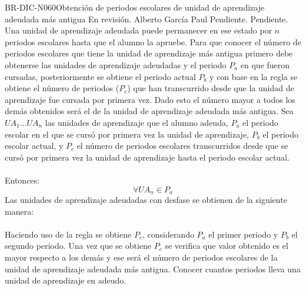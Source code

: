 \begin{BusinessRule}{BR-DIC-N060}{Obtención de periodos escolares de unidad de aprendizaje adeudada más antigua}
	{\bcCondition} %
	{\btTimer}     %
	{\blInfluencing}     %
	\BRItem[Estado] En revisión.
	 Alberto García Paul 
	 Pendiente.
	 Pendiente. 
	\BRItem[Descripción] Una unidad de aprendizaje adeudada puede permanecer en ese estado por $n$ periodos escolares hasta que el alumno la apruebe. Para que conocer el número de periodos escolares que tiene la unidad de aprendizaje más antigua primero debe obtenerse las unidades de aprendizaje adeudadas y el periodo $P_{a}$ en que fueron cursadas, posteriormente se obtiene el periodo actual $P_{b}$ y con base en la regla  se obtiene el número de periodos ($P_{c}$) que han transcurrido desde que la unidad de aprendizaje fue cursada por primera vez. Dado esto el número mayor a todos los demás obtenidos será el de la unidad de aprendizaje adeudada más antigua. 
	\BRItem[Sentencia] \cdtEmpty
	Sea $UA_{1} \ldots UA_{n}$ las unidades de aprendizaje que el alumno adeuda, $P_{a}$ el periodo escolar en el que se cursó por primera vez la unidad de aprendizaje, $P_{b}$ el periodo escolar actual, y $P_{c}$ el número de periodos escolares transcurridos desde que se cursó por primera vez la unidad de aprendizaje hasta el periodo escolar actual. \\ \\
	Entonces: \\
	\[\forall UA_{n} \in P_{a} \]
	Las unidades de aprendizaje adeudadas con desfase se obtienen de la siguiente manera:\\ \\
	Haciendo uso de la regla  se obtiene $P_{c}$, considerando $P_{a}$ el primer periodo y $P_{b}$ el segundo periodo. Una vez que se obtiene $P_{c}$ se verifica que valor obtenido es el mayor respecto a los demás y ese será el número de periodos escolares de la unidad de aprendizaje adeudada más antigua.
	\BRItem[Motivación] Conocer cuantos periodos lleva una unidad de aprendizaje en adeudo.
\end{BusinessRule}



